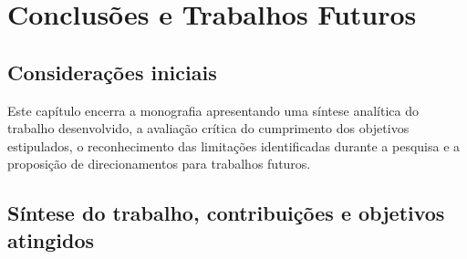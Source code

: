\chapter{Conclusões e Trabalhos Futuros} \label{Cap:Conclusoes}

\label{chp:conclusao}

\section{Considerações iniciais}
\label{sec:concl_consideracoes_iniciais}

Este capítulo encerra a monografia apresentando uma síntese analítica do trabalho desenvolvido, a avaliação crítica do cumprimento dos objetivos estipulados, o reconhecimento das limitações identificadas durante a pesquisa e a proposição de direcionamentos para trabalhos futuros.

\section{Síntese do trabalho, contribuições e objetivos atingidos}
\label{sec:concl_sintese}
\label{sec:concl_objetivos_atingidos}

